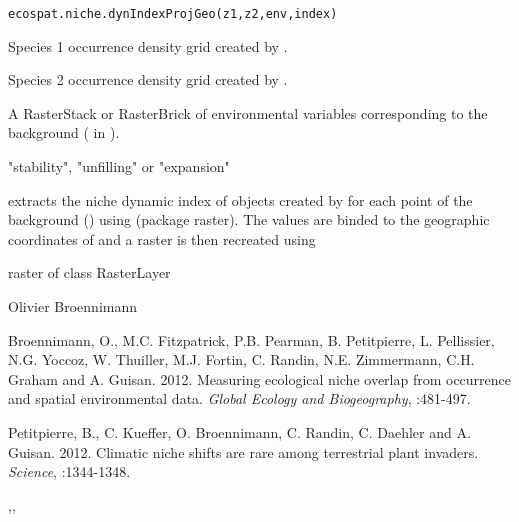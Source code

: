 \documentclass[a4paper]{book}
\begin{document}
%
\begin{Usage}
\begin{verbatim}
ecospat.niche.dynIndexProjGeo(z1,z2,env,index)
\end{verbatim}
\end{Usage}
%
\begin{Arguments}
\begin{ldescription}
\item[\code{z1}] Species 1 occurrence density grid created by .
\item[\code{z2}] Species 2 occurrence density grid created by .
\item[\code{env}] A RasterStack or RasterBrick of environmental variables corresponding to the background ( in ).
\item[\code{index}] "stability", "unfilling" or "expansion"
\end{ldescription}
\end{Arguments}
%
\begin{Details}\relax
extracts the niche dynamic index of objects created by  for each point of the background () using  (package raster). The values are binded to the geographic coordinates of  and a raster is then recreated using 
\end{Details}
%
\begin{Value}
raster of class RasterLayer
\end{Value}
%
\begin{Author}\relax
Olivier Broennimann 
\end{Author}
%
\begin{References}\relax
Broennimann, O., M.C. Fitzpatrick, P.B. Pearman, B. Petitpierre, L. Pellissier, N.G. Yoccoz, W. Thuiller, M.J. Fortin, C. Randin, N.E. Zimmermann, C.H. Graham and A. Guisan. 2012. Measuring ecological niche overlap from occurrence and spatial environmental data. \emph{Global Ecology and Biogeography}, :481-497.


Petitpierre, B., C. Kueffer, O. Broennimann, C. Randin, C. Daehler and A. Guisan. 2012. Climatic niche shifts are rare among terrestrial plant invaders. \emph{Science}, :1344-1348.
\end{References}
%
\begin{SeeAlso}\relax
{},, 
\end{SeeAlso}
\end{document}
